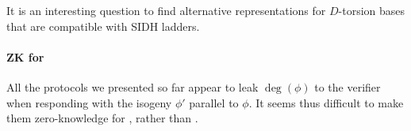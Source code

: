 It is an interesting question to find alternative representations for
$D$-torsion bases that are compatible with SIDH ladders.

\paragraph{ZK for \R[isog]}
All the protocols we presented so far appear to leak $\deg(\phi)$ to
the verifier when responding with the isogeny $\phi'$ parallel to
$\phi$. It seems thus difficult to make them zero-knowledge for
\R[isog], rather than \R[deg].

